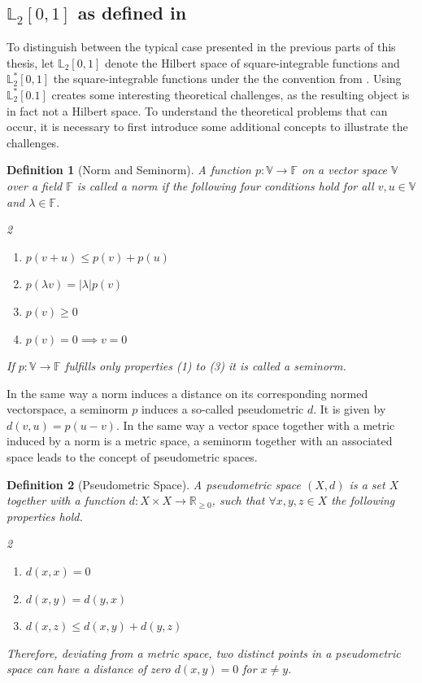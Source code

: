 \documentclass[12pt, a4paper]{article}
\theoremstyle{MAstyle} \newtheorem{assumption}{Assumption}[section]
\theoremstyle{MAstyle} \newtheorem{definition}{Definition}[section]
\theoremstyle{MAstyle} \newtheorem{theorem}{Theorem}[section]
\begin{document}
		\subsection{$\mathbb{L}_2[0,1]$ as defined in \cite{bugni_permutation_2021}}\label{deviation}
		To distinguish between the typical case presented in the previous parts of this thesis, let $\mathbb{L}_2[0,1]$ denote the Hilbert space of square-integrable functions and $\mathbb{L}^{*}_2[0,1]$ the square-integrable functions under the the convention from \cite{bugni_permutation_2021}.		
		Using $\mathbb{L}^{*}_2[0.1]$ creates some interesting theoretical challenges, as the resulting object is in fact not a Hilbert space. To understand the theoretical problems that can occur, it is necessary to first introduce some additional concepts to illustrate the challenges.
		\begin{definition}[Norm and Seminorm]
			A function $p : \mathbb{V} \rightarrow \mathbb{F}$ on a vector space $\mathbb{V}$ over a field $\mathbb{F}$ is called a norm if the following four conditions hold for all $v,u \in \mathbb{V}$ and $\lambda \in \mathbb{F}$.
			\begin{multicols}{2}
				\begin{enumerate}
					\item $p(v + u) \leq p(v) + p(u)$
					\item $p(\lambda v) = |\lambda| p(v)$
					\item $p(v) \geq 0$
					\item $p(v) = 0 \implies v = 0$
				\end{enumerate}
			\end{multicols}
			If $p : \mathbb{V} \rightarrow \mathbb{F}$ fulfills only properties (1) to (3) it is called a seminorm.
		\end{definition}
		
		In the same way a norm induces a distance on its corresponding normed vectorspace, a seminorm $p$ induces a so-called pseudometric $d$. It is given by $d(v,u) = p(u-v)$. In the same way a vector space together with a metric induced by a norm is a metric space, a seminorm together with an associated space leads to the concept of pseudometric spaces.

		\begin{definition}[Pseudometric Space]
			A pseudometric space $\left(X, d\right)$ is a set $X$ together with a function $d:X\times X \rightarrow \mathbb{R}_{\geq 0}$, such that $\forall x,y,z \in X$ the following properties hold.
			\begin{multicols}{2}
				\begin{enumerate}
					\item $d(x,x) = 0$
					\item $d(x,y) = d(y,x)$
					\item $d(x,z) \leq d(x,y) + d(y,z)$
				\end{enumerate}
			\end{multicols}
			Therefore, deviating from a metric space, two distinct points in a pseudometric space can have a distance of zero $d(x,y) = 0$ for $x \neq y$.
		\end{definition}
		
\end{document}
